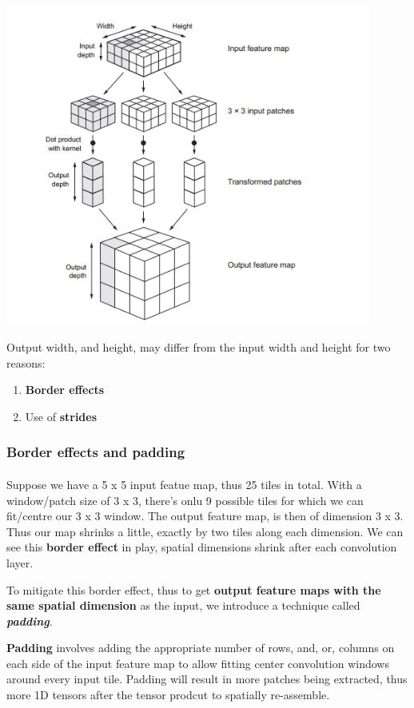 \documentclass[12pt, a4paper]{article}
\begin{document}
{
   \centering
   \includegraphics[width=12cm]{how_conv_works.png}

}

Output width, and height, may differ from the input width and height for two reasons: 
\begin{enumerate}
   \item \textbf{Border effects}
   \item Use of \textbf{strides}
\end{enumerate}

\subsubsection{Border effects and padding}
\paragraph*{}
Suppose we have a 5 x 5 input featue map, thus 25 tiles in total. With a window/patch size 
of 3 x 3, there's onlu 9 possible tiles for which we can fit/centre our 3 x 3 window.
The output feature map, is then of dimension 3 x 3. Thus our map shrinks a little, 
exactly by two tiles along each dimension. We can see this \textbf{border effect} in play,
spatial dimensions shrink after each convolution layer.

To mitigate this border effect, thus to get 
\textbf{output feature maps with the same spatial dimension} as the input, 
we introduce a technique called \textbf{\textit{padding}}.

\textbf{Padding} involves adding the appropriate number of rows, and, or, columns
on each side of the input feature map to allow fitting center convolution windows around every 
input tile. Padding will result in more patches being extracted, thus more 1D tensors 
after the tensor prodcut to spatially re-assemble. 
\end{document}

